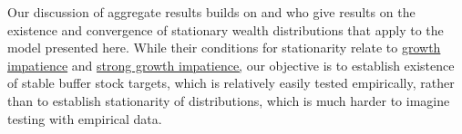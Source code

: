 \documentclass[BufferStockTheory]{subfiles}
\begin{document}
Our discussion of aggregate results builds on \cite{szeidlInvariant} and \cite{harmenbergInvariant} who give results on the existence and convergence of stationary wealth distributions that apply to the model presented here.
While their conditions for stationarity relate to \hyperlink{GICRaw}{growth impatience} and \hyperlink{GICMod}{strong growth impatience,} our objective is to establish existence of stable buffer stock targets, which is relatively easily tested empirically, rather than to establish stationarity of distributions, which is much harder to imagine testing with empirical data.


\ifSubfilesClassLoaded{ 
    
  }{}
\end{document}
